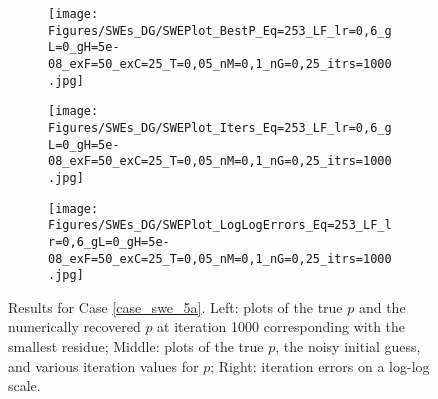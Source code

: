 \begin{figure}[h]
    \begin{subfigure}[t]{0.32\textwidth}
        \centering
        \texttt{[image: Figures/SWEs\_DG/SWEPlot\_BestP\_Eq=253\_LF\_lr=0,6\_gL=0\_gH=5e-08\_exF=50\_exC=25\_T=0,05\_nM=0,1\_nG=0,25\_itrs=1000.jpg]}
    \end{subfigure}
    \begin{subfigure}[t]{0.32\textwidth}
        \centering
        \texttt{[image: Figures/SWEs\_DG/SWEPlot\_Iters\_Eq=253\_LF\_lr=0,6\_gL=0\_gH=5e-08\_exF=50\_exC=25\_T=0,05\_nM=0,1\_nG=0,25\_itrs=1000.jpg]}
    \end{subfigure}
    \begin{subfigure}[t]{0.32\textwidth}
        \texttt{[image: Figures/SWEs\_DG/SWEPlot\_LogLogErrors\_Eq=253\_LF\_lr=0,6\_gL=0\_gH=5e-08\_exF=50\_exC=25\_T=0,05\_nM=0,1\_nG=0,25\_itrs=1000.jpg]}
    \end{subfigure}
    \caption{Results for Case \eqref{case_swe_5a}. 
    Left: plots of the true $p$ and the numerically recovered $p$ at iteration 1000 corresponding with the smallest residue; Middle: plots of the true $p$, the noisy initial guess, and various iteration values for $p$; Right: iteration errors on a log-log scale.}
    \label{fig:swe_5A}
\end{figure}

